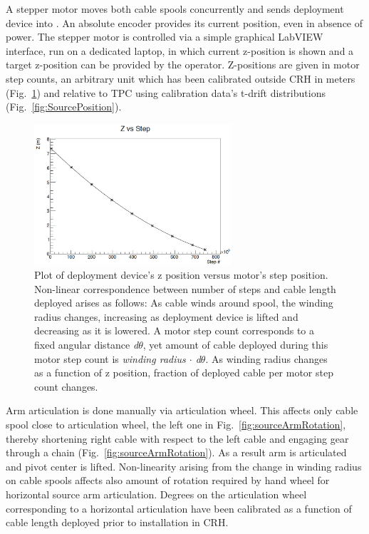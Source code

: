 A stepper motor moves both cable spools concurrently and sends deployment device into \lsv. An absolute encoder provides its current position, even in absence of power. The stepper motor is controlled via a simple graphical LabVIEW interface, run on a dedicated laptop, in which current z-position is shown and a target z-position can be provided by the operator. Z-positions are given in motor step counts, an arbitrary unit which has been calibrated outside CRH in meters (Fig.~\ref{fig:z_test}) and relative to TPC using calibration data's t-drift distributions (Fig.~\ref{fig:SourcePosition}).

\begin{figure}[htbp]
 \centering
 \includegraphics[width=0.65\textwidth]{Figures/Z_positioning_test}
 \caption{Plot of deployment device's z position versus motor's step position. Non-linear correspondence between number of steps and cable length deployed arises as follows: As cable winds around spool, the winding radius changes, increasing as deployment device is lifted and decreasing as it is lowered. A motor step count corresponds to a fixed angular distance \textit{d$\theta$}, yet amount of cable deployed during this motor step count is \textit{winding radius $\cdot$ d$\theta$}. As winding radius changes as a function of z position, fraction of deployed cable per motor step count changes.}
 \label{fig:z_test}
\end{figure}

\label{sec:Nonlinearity:MotorStepCounts}
Arm articulation is done manually via articulation wheel. This affects only cable spool close to articulation wheel, the left one in Fig.~\ref{fig:sourceArmRotation}, thereby shortening right cable with respect to the left cable and engaging gear through a chain (Fig.~\ref{fig:sourceArmRotation}). As a result arm is articulated and pivot center is lifted. Non-linearity arising from the change in winding radius on cable spools affects also amount of rotation required by hand wheel for horizontal source arm articulation.
Degrees on the articulation wheel corresponding to a horizontal articulation have been calibrated as a function of cable length deployed prior to installation in CRH.

